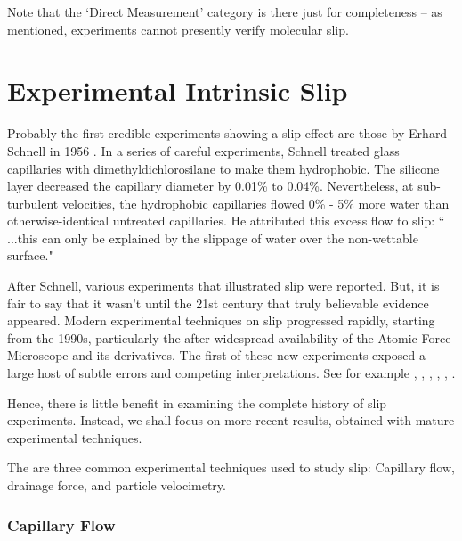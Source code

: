 \documentclass[12pt, a4paper, twoside, openright]{book}
\begin{document}
Note that the `Direct Measurement' category is there just for completeness -- as mentioned,  experiments cannot presently verify molecular slip.

\clearpage
\section{Experimental Intrinsic Slip}

Probably the first credible experiments showing a slip effect are those by Erhard Schnell in 1956 \cite{Schnell1956}. In a series of careful experiments, Schnell treated glass capillaries with dimethyldichlorosilane to make them hydrophobic. The silicone layer decreased the capillary diameter by 0.01\% to 0.04\%. Nevertheless, at sub-turbulent velocities, the hydrophobic capillaries flowed 0\% - 5\% more water than otherwise-identical untreated capillaries. He attributed this excess flow to slip: `` ...this can only be explained by the slippage of water over the non-wettable surface."  

After Schnell, various experiments that illustrated slip were reported. But, it is fair to say that it wasn't until the 21st century that truly believable evidence appeared.
Modern experimental techniques on slip progressed rapidly, starting from the 1990s, particularly the after widespread availability of the Atomic Force Microscope and its derivatives. 
The first of these new experiments exposed a large host of subtle errors and competing interpretations. 
See for example \cite{Pit2000}, \cite{CraigNetoWilliams2001}, \cite{BaudryCharlaix2001}, \cite{ZhuGranick2001}, \cite{Bonaccurso2002}, \cite{Neto2003}.

Hence, there is little benefit in examining the complete history of slip experiments.  Instead, we shall focus on more recent results, obtained with mature experimental techniques.


The are three common experimental techniques used to study slip: Capillary flow, drainage force, and particle velocimetry.

\subsubsection{Capillary Flow}
\end{document}
